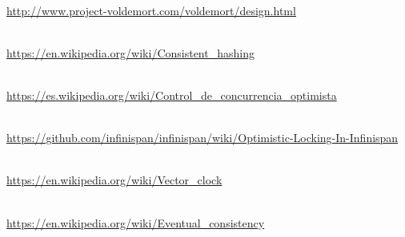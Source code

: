 \begin{thebibliography}{9}
  
\\
\url{http://www.project-voldemort.com/voldemort/design.html}

 \\
\url{https://en.wikipedia.org/wiki/Consistent_hashing}

 \\
\url{https://es.wikipedia.org/wiki/Control_de_concurrencia_optimista}

 \\
\url{https://github.com/infinispan/infinispan/wiki/Optimistic-Locking-In-Infinispan}

 \\
\url{https://en.wikipedia.org/wiki/Vector_clock}

 \\
\url{https://en.wikipedia.org/wiki/Eventual_consistency}

\end{thebibliography}
